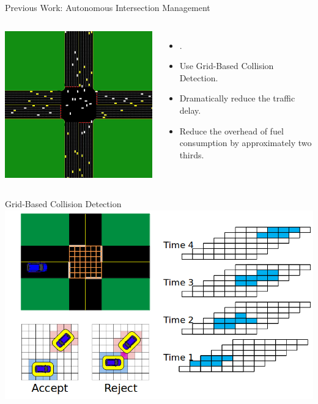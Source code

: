 \documentclass{beamer}
\begin{document}
\begin{frame}{Previous Work: Autonomous Intersection Management}
\begin{columns}[c]
		\includegraphics[width=\textwidth]{aim.png}
				
		\begin{itemize}
		\item \cite{bib:Dresner08Multiagent}.
		\item Use Grid-Based Collision Detection.\pause
		\item Dramatically reduce the traffic delay.
		\item Reduce the overhead of fuel consumption by approximately
		two thirds.
		\end{itemize}
\end{columns}
\end{frame}

\begin{frame}{Grid-Based Collision Detection}
	\includegraphics[width=\textwidth]{grids.png}
\end{frame}
\end{document}
